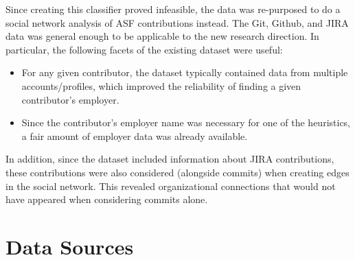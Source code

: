 Since creating this classifier proved infeasible, the data was re-purposed to do a social network analysis of ASF contributions instead. 
The Git, Github, and JIRA data was general enough to be applicable to the new research direction. In particular, the following facets of the existing dataset were useful:
\begin{itemize}
	\item For any given contributor, the dataset typically contained data from multiple accounts/profiles, which improved the reliability of finding a given contributor's employer.
	\item Since the contributor's employer name was necessary for one of the heuristics, a fair amount of employer data was already available.
\end{itemize}
In addition, since the dataset included information about JIRA contributions, these contributions were also considered (alongside commits) when creating edges in the social network. This revealed organizational connections that would not have appeared when considering commits alone.

\section{Data Sources}

